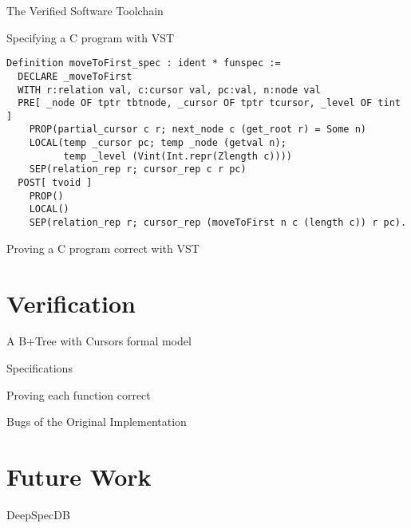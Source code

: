 \documentclass[page number,usenames,dvipsnames]{beamer}
\begin{document}
\begin{frame}{The Verified Software Toolchain}

  
\end{frame}

\begin{frame}[fragile]{Specifying a C program with VST}
 \begin{lstlisting}[language=Coq,basicstyle=\scriptsize]
Definition moveToFirst_spec : ident * funspec :=
  DECLARE _moveToFirst
  WITH r:relation val, c:cursor val, pc:val, n:node val
  PRE[ _node OF tptr tbtnode, _cursor OF tptr tcursor, _level OF tint ]
    PROP(partial_cursor c r; next_node c (get_root r) = Some n)
    LOCAL(temp _cursor pc; temp _node (getval n);
          temp _level (Vint(Int.repr(Zlength c))))
    SEP(relation_rep r; cursor_rep c r pc)
  POST[ tvoid ]
    PROP()
    LOCAL()
    SEP(relation_rep r; cursor_rep (moveToFirst n c (length c)) r pc).
\end{lstlisting}
\end{frame}


\begin{frame}{Proving a C program correct with VST}

  
\end{frame}

\section{Verification}
\begin{frame}{A B+Tree with Cursors formal model}

  
\end{frame}

\begin{frame}{Specifications}

\end{frame}

\begin{frame}{Proving each function correct}


\end{frame}

\begin{frame}{Bugs of the Original Implementation}
  
\end{frame}

\section{Future Work}
\begin{frame}{DeepSpecDB}

\end{frame}
  
\end{document}
